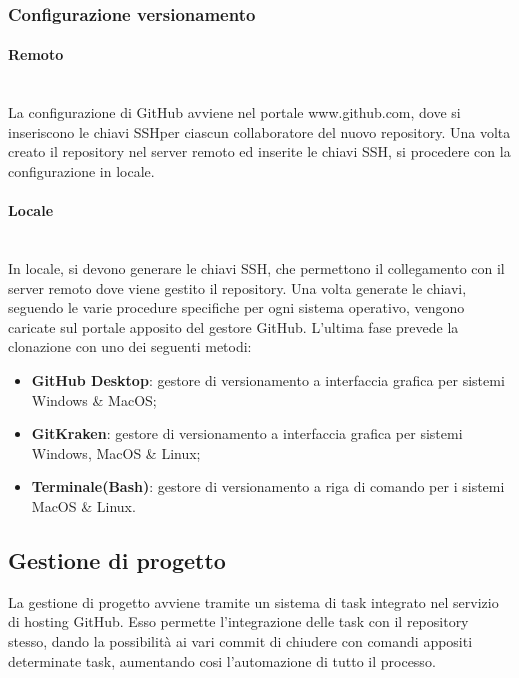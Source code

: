 \subsubsection{Configurazione versionamento}

\paragraph{Remoto} \-\\
	La configurazione di GitHub avviene nel portale www.github.com, dove si inseriscono le chiavi SSH\glossario per ciascun collaboratore del nuovo repository. 
	Una volta creato il repository nel server remoto ed inserite le chiavi SSH, si procedere con la configurazione in locale.
	
\paragraph{Locale} \-\\
	In locale, si devono generare le chiavi SSH, che permettono il collegamento con il server remoto dove viene gestito il repository. 
	Una volta generate le chiavi, seguendo le varie procedure specifiche per ogni sistema operativo, vengono caricate sul portale apposito del gestore GitHub.
	L'ultima fase prevede la clonazione con uno dei seguenti metodi: 

	\begin{itemize}
		\item \textbf{GitHub Desktop}: gestore di versionamento a interfaccia grafica per sistemi Windows \& MacOS; 
		\item \textbf{GitKraken}: gestore di versionamento a interfaccia grafica per sistemi Windows, MacOS \& Linux; 		
		\item \textbf{Terminale(Bash)}: gestore di versionamento a riga di comando per i sistemi MacOS \& Linux.
	\end{itemize}
		
\subsection{Gestione di progetto}\label{ProcessiSupporto_GestioneProgetto}
La gestione di progetto avviene tramite un sistema di task integrato nel servizio di hosting GitHub. 
Esso permette l'integrazione delle task con il repository stesso, dando la possibilità ai vari commit di chiudere con comandi appositi determinate task, aumentando cosi l'automazione di tutto il processo. 

